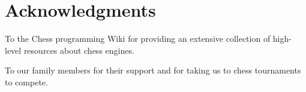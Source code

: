 
\chapter*{Acknowledgments}

To the Chess programming Wiki for providing an extensive collection of high-level resources about chess engines.

\vspace{1em}

\noindent  To our family members for their support and for taking us to chess tournaments to compete.
